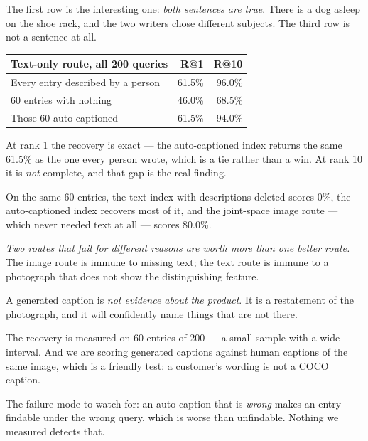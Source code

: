 \documentclass[11pt,a4paper]{article}
\begin{document}
The first row is the interesting one: \emph{both sentences are true}. There is
a dog asleep on the shoe rack, and the two writers chose different subjects.
The third row is not a sentence at all.

\begin{center}
\small
\begin{tabular}{lrr}
\toprule
\textbf{Text-only route, all 200 queries} & \textbf{R@1} & \textbf{R@10} \\
\midrule
Every entry described by a person & 61.5\% & 96.0\% \\
60 entries with nothing & 46.0\% & 68.5\% \\
Those 60 auto-captioned & 61.5\% & 94.0\% \\
\bottomrule
\end{tabular}
\end{center}

At rank 1 the recovery is exact --- the auto-captioned index returns the same
61.5\% as the one every person wrote, which is a tie rather than a win. At rank
10 it is \emph{not} complete, and that gap is the real finding.

\begin{keybox}[title={Meanwhile, the route that never read a description}]
On the same 60 entries, the text index with descriptions deleted scores 0\%,
the auto-captioned index recovers most of it, and the joint-space image route
--- which never needed text at all --- scores 80.0\%.

\emph{Two routes that fail for different reasons are worth more than one better
route.} The image route is immune to missing text; the text route is immune to
a photograph that does not show the distinguishing feature.
\end{keybox}

\begin{failbox}[title={Failure condition --- three things not to claim}]
A generated caption is \emph{not evidence about the product}. It is a
restatement of the photograph, and it will confidently name things that are not
there.

The recovery is measured on 60 entries of 200 --- a small sample with a wide
interval. And we are scoring generated captions against human captions of the
same image, which is a friendly test: a customer's wording is not a COCO
caption.

The failure mode to watch for: an auto-caption that is \emph{wrong} makes an
entry findable under the wrong query, which is worse than unfindable. Nothing
we measured detects that.
\end{failbox}
\end{document}
